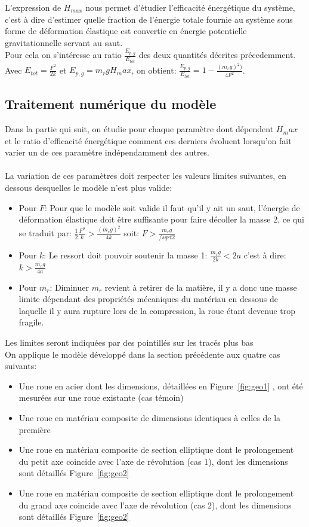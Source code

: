 L'expression de $H_{max}$ nous permet d'étudier l'efficacité énergétique du système, c'est à dire d'estimer quelle fraction de l'énergie totale fournie au système sous forme de déformation élastique est convertie en énergie potentielle gravitationnelle servant au saut. \\
Pour cela on s'intéresse au ratio $\frac{E_{p,g}}{E_{tot}}$ des deux quantités décrites précedemment. \\
Avec $E_{tot}=\frac{F^2}{2k}$ et $E_{p,g}=m_r g H_max$, on obtient:  $\frac{E_{p,g}}{E_{tot}}=1-\frac{(m_r g)^2)}{4F^2}$.

\subsection{Traitement numérique du modèle}
Dans la partie qui suit, on étudie pour chaque paramètre dont dépendent $H_max$ et le ratio d'efficacité énergétique comment ces derniers évoluent lorsqu'on fait varier un de ces paramètre indépendamment des autres.
\\ 
\\ 
La variation de ces paramètres doit respecter les valeurs limites suivantes, en dessous desquelles le modèle n'est plus valide:
\begin{itemize}
    \item Pour $F$: Pour que le modèle soit valide il faut qu’il y ait un saut, l'énergie de déformation élastique doit être suffisante pour faire décoller la masse 2, ce qui se traduit par: $\frac{1}{2} \frac{F^2}{k}>\frac{(m_r g)^2}{4k}$  soit: $F>\frac{m_r g}{/sqrt{2}}$
    \item Pour $k$: Le ressort doit pouvoir soutenir la masse 1: $\frac{m_r g}{2k}<2a$ c'est à dire: $k>\frac{m_r g}{4a}$ 
    \item Pour $m_r$: Diminuer $m_r$ revient à retirer de la matière, il y a donc une masse limite dépendant des propriétés mécaniques du matériau en dessous de laquelle il y aura rupture lors de la compression, la roue étant devenue trop fragile.
\end{itemize}
Les limites seront indiquées par des pointillés sur les tracés plus bas
\\
On applique le modèle développé dans la section précédente aux quatre cas suivants:
\begin{itemize}
	\item Une roue en acier dont les dimensions, détaillées en Figure~\ref{fig:geo1} ,  ont été mesurées sur une roue existante (cas témoin)
	\item Une roue en matériau composite de dimensions identiques à celles de la première
	\item Une roue en matériau composite de section elliptique dont le prolongement du petit axe coincide avec l'axe de révolution (cas 1), dont les dimensions sont détaillés Figure~\ref{fig:geo2}
	\item Une roue en matériau composite de section elliptique dont le prolongement du grand axe coincide avec l'axe de révolution (cas 2), dont les dimensions sont détaillés Figure~\ref{fig:geo2}
\end{itemize}
